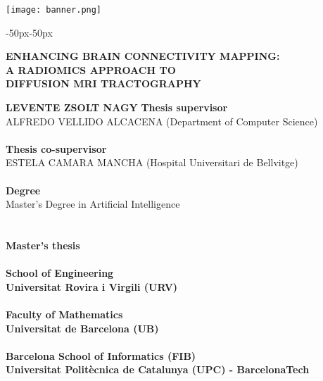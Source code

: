 \begin{titlepage}
    \begin{center}
        \begingroup
          \let\clearpage\relax

          \texttt{[image: banner.png]}
          \vfill
          \LARGE
          \begin{adjustwidth}{-50px}{-50px}\begin{center}
          \textbf{\MakeUppercase{Enhancing Brain Connectivity Mapping:\\A Radiomics Approach to\\Diffusion MRI Tractography}}
          \end{center}\end{adjustwidth}
          \vfill
          \large
          \textbf{\MakeUppercase{Levente Zsolt Nagy}}
          \vfill
          \normalsize
          \textbf{Thesis supervisor}\\
          \MakeUppercase{Alfredo Vellido Alcacena} (Department of Computer Science)\\
          \hfill\\
          \textbf{Thesis co-supervisor}\\
          \MakeUppercase{Estela Camara Mancha} (Hospital Universitari de Bellvitge)\\
          \hfill\\
          \textbf{Degree}\\
          Master's Degree in Artificial Intelligence\\
          \hfill\\\hfill\\
          \textbf{Master's thesis}\\
          \hfill\\
          \textbf{School of Engineering}\\
          \textbf{Universitat Rovira i Virgili (URV)}\\
          \hfill\\
          \textbf{Faculty of Mathematics}\\
          \textbf{Universitat de Barcelona (UB)}\\
          \hfill\\
          \textbf{Barcelona School of Informatics (FIB)}\\
          \textbf{Universitat Politècnica de Catalunya (UPC) - BarcelonaTech}\\


\end{center}
\end{titlepage}
